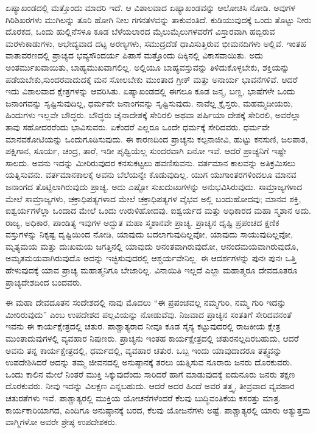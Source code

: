 ಏಷ್ಯಾಖಂಡದಲ್ಲಿ ಮತ್ತೊಂದು ಮಾದರಿ ಇದೆ. ಆ ವಿಶಾಲವಾದ ಏಷ್ಯಾಖಂಡವನ್ನು ಆಲೋಚಿಸಿ ನೋಡಿ. ಅವುಗಳ ಗಿರಿಶಿಖರಗಳು ಮುಗಿಲನ್ನು ತೂರಿ ಹೋಗಿ ನೀಲ ಗಗನ\break ತಳವನ್ನು ತಾಕುವಂತಿದೆ. ಕುಡಿಯುವುದಕ್ಕೆ ಒಂದು ತೊಟ್ಟು ನೀರು ದೊರಕದ, ಒಂದು ಹುಲ್ಲಿನೆಸಳೂ ಕೂಡ ಬೆಳೆಯಲಾರದ ಮೈಲುಮೈಲುಗಳವರೆಗೆ ವಿಸ್ತಾರವಾಗಿ ಹಬ್ಬಿರುವ ಮರಳುಕಾಡುಗಳು, ಅಭೇದ್ಯವಾದ ದಟ್ಟ ಅರಣ್ಯಗಳು, ಸಮುದ್ರದೆಡೆ ಧಾವಿಸುತ್ತಿರುವ ಭೀಮನದಿಗಳು ಅಲ್ಲಿವೆ. ಇಂತಹ ವಾತಾವರಣದಲ್ಲಿ ಪ್ರಾಚ್ಯದ ಭವ್ಯಸೌಂದರ್ಯ ಪಿಪಾಸೆ ಮತ್ತೊಂದು ದಿಕ್ಕಿನಲ್ಲಿ ವಿಕಾಸವಾಯಿತು. ಅದು ಅಂತರ್ಮುಖವಾಯಿತು, ಬಾಹ್ಯಮುಖವಾಗಲಿಲ್ಲ. ಅಲ್ಲಿಯೂ ಬಾಹ್ಯವಸ್ತುವನ್ನು ತಿಳಿದುಕೊಳ್ಳಬೇಕು, ಶಕ್ತಿಯನ್ನು ಪಡೆಯಬೇಕು,\break ಸುಂದರವಾದುದಕ್ಕೆ ಮನ ಸೋಲಬೇಕು ಮುಂತಾದ ಗ್ರೀಕ್​ ಮತ್ತು ಅನಾರ್ಯ ಭಾವನೆಗಳಿವೆ. ಆದರೆ ಇದು ವಿಶಾಲವಾದ ಕ್ಷೇತ್ರಗಳನ್ನು ಆವರಿಸಿತು. ಏಷ್ಯಾಖಂಡದಲ್ಲಿ ಈಗಲೂ ಕೂಡ ಜನ್ಮ, ಬಣ್ಣ, ಭಾಷೆಗಳೇ ಒಂದು ಜನಾಂಗವನ್ನು ಸೃಷ್ಟಿಸುವುದಿಲ್ಲ, ಧರ್ಮವೇ ಜನಾಂಗವನ್ನು ಸೃಷ್ಟಿಸುವುದು. ನಾವೆಲ್ಲ ಕ್ರೈಸ್ತರು, ಮಹಮ್ಮದೀಯರು, ಹಿಂದುಗಳು ಇಲ್ಲವೇ ಬೌದ್ಧರು. ಬೌದ್ಧರು ಚೈನಾದೇಶಕ್ಕೆ ಸೇರಿರಲಿ ಅಥವಾ ಪರ್ಷಿಯಾ ದೇಶಕ್ಕೆ ಸೇರಿರಲಿ, ಅವರೆಲ್ಲಾ ತಾವು ಸಹೋದರರೆಂದು ಭಾವಿಸುವರು. ಏಕೆಂದರೆ ಎಲ್ಲರೂ ಒಂದೇ ಧರ್ಮಕ್ಕೆ ಸೇರಿದವರು. ಧರ್ಮವೇ ಮಾನವಕೋಟಿಯನ್ನು ಒಂದುಗೂಡಿಸುವುದು. ಈ ಕಾರಣದಿಂದ ಪ್ರಾಚ್ಯನು ಕಲ್ಪನಾಜೀವಿ, ಹುಟ್ಟು ಕನಸುಣಿ, ಜಲಪಾತ, ಪಕ್ಷಿಗಾನ, ಸೂರ್ಯ, ಚಂದ್ರ, ತಾರೆ, ಇಡೀ ಪೃಥ್ವಿಯೆಲ್ಲ ಸುಂದರವಾಗಿ ಏನೋ ಇವೆ. ಆದರೆ ಪ್ರಾಚ್ಯನಿಗೆ ಇಷ್ಟೇ ಸಾಲದು. ಅವನು ಇದನ್ನು ಮೀರಿರುವುದರ ಕನಸುಕಟ್ಟಲು ಹವಣಿಸುವನು. ವರ್ತಮಾನ ಕಾಲವನ್ನು ಅತಿಕ್ರಮಿಸಲು ಯತ್ನಿಸುವನು. ವರ್ತಮಾನಕಾಲಕ್ಕೆ ಅವನು ಬೆಲೆಯನ್ನೇ ಕೊಡುವುದಿಲ್ಲ. ಯುಗ ಯುಗಾಂತರಗಳಿಂದಲೂ ಮಾನವ ಜನಾಂಗದ ತೊಟ್ಟಿಲಾಗಿರುವುದು ಪ್ರಾಚ್ಯ. ಅದು ಎಷ್ಟೋ ಸುಖದುಃಖಗಳನ್ನು ಅನುಭವಿಸಿರುವುದು. ಸಾಮ್ರಾಜ್ಯಗಳಾದ ಮೇಲೆ ಸಾಮ್ರಾಜ್ಯಗಳು, ಚಕ್ರಾಧಿಪತ್ಯಗಳಾದ ಮೇಲೆ ಚಕ್ರಾಧಿಪತ್ಯಗಳ ವೈಭವ ಅಲ್ಲಿ ಬಂದುಹೋದವು; ಮಾನವ ಶಕ್ತಿ, ಐಶ್ವರ್ಯಗಳೆಲ್ಲಾ ಒಂದಾದ ಮೇಲೆ ಒಂದು ಉರುಳಿಹೋದವು. ಐಶ್ವರ್ಯದ ಮತ್ತು ಅಧಿಕಾರದ ಮಹಾ ಸ್ಮಶಾನ ಅದು. ರಾಜ್ಯ, ಅಧಿಕಾರ, ಪಾಂಡಿತ್ಯ ಇವುಗಳ ಅದ್ಭುತ ಮಹಾ ಸ್ಮಶಾನವೇ ಪ್ರಾಚ್ಯ. ಪ್ರಾಚ್ಯನ ದೃಷ್ಟಿ ಪ್ರಪಂಚದ ಕ್ಷಣಿಕ ವಸ್ತುಗಳನ್ನು ನಿಕೃಷ್ಟ ದೃಷ್ಟಿಯಿಂದ ನೋಡಿ, ಯಾವುದು ಬದಲಾಗುವುದಿಲ್ಲವೋ, ಯಾವುದು ಸಾಯುವುದಿಲ್ಲವೋ, ಮೃತ್ಯಮಯ ಮತ್ತು ದುಃಖಮಯ ಜಗತ್ತಿನಲ್ಲಿ ಯಾವುದು ಅನಂತವಾಗಿರುವುದೋ, ಆನಂದಮಯವಾಗಿರುವುದೊ, ಅಮೃತಮಯ\-ವಾಗಿರುವುದೊ ಅದನ್ನು ಇಚ್ಛಿಸುವುದರಲ್ಲಿ ಆಶ್ಚರ್ಯವೇನಿಲ್ಲ. ಈ ಆದರ್ಶಗಳನ್ನು ಪುನಃ ಪುನಃ ಒತ್ತಿ ಹೇಳುವುದಕ್ಕೆ ಯಾವ ಪ್ರಾಚ್ಯ ಮಹಾತ್ಮನಿಗೂ ಬೇಜಾರಿಲ್ಲ. ವಿನಾಯಿತಿ ಇಲ್ಲದೆ ಎಲ್ಲಾ ಮಹಾತ್ಮರೂ ದೇವದೂತರೂ ಪ್ರಾಚ್ಯದೇಶದಿಂದ ಬಂದವರು.

ಈ ಮಹಾ ದೇವದೂತನ ಸಂದೇಶದಲ್ಲಿ ನಾವು ಮೊದಲು “ಈ ಪ್ರಪಂಚವಲ್ಲ ನಮ್ಮ\break ಗುರಿ, ನಮ್ಮ ಗುರಿ ಇದನ್ನು ಮೀರಿರುವುದು” ಎಂಬ ಉಪದೇಶದ ಪಲ್ಲವಿಯನ್ನು ನೋಡು\-ವೆವು. ನಿಜವಾದ ಪ್ರಾಚ್ಯನ ಸಂತತಿಗೆ ಸೇರಿದವನಂತೆ ಇವನು ಈ ಕಾರ್ಯಕ್ಷೇತ್ರದಲ್ಲಿ ಚತುರ. ಪಾಶ್ಚಾತ್ಯರಾದ ನೀವೂ ಕೂಡ ಸೈನ್ಯ ಕಟ್ಟುವುದರಲ್ಲಿ ರಾಜಕೀಯ ಕ್ಷೇತ್ರ ಮುಂತಾದುವು\-ಗಳಲ್ಲಿ ವ್ಯವಹಾರ ನಿಪುಣರು. ಪ್ರಾಚ್ಯನು ಇಂತಹ ಕಾರ್ಯಕ್ಷೇತ್ರದಲ್ಲಿ ಚತುರನಲ್ಲ\-ದಿರಬಹುದು, ಆದರೆ ಅವನು ತನ್ನ ಕಾರ್ಯಕ್ಷೇತ್ರದಲ್ಲಿ, ಧರ್ಮದಲ್ಲಿ, ವ್ಯವಹಾರ ಚತುರ. ಒಬ್ಬ ಇಂದು ಯಾವುದಾದರೂ ತತ್ತ್ವವನ್ನು ಉಪದೇಶಿಸಿದರೆ ಅದನ್ನು ತಮ್ಮ ಜೀವನದಲ್ಲಿ ಅನುಷ್ಠಾನಕ್ಕೆ ತರಲು ಯತ್ನಿಸುವ ನೂರಾರು ಜನರು ದೊರಕುವರು. ಒಂದು ಕಾಲಿನ ಮೇಲೆ ನಿಂತರೆ ಮುಕ್ತಿ ಸಿಕ್ಕುವುದೆಂದು ಸಾರಿದರೆ ಹಾಗೆ ಮಾಡುವುದಕ್ಕೆ ಐದುನೂರು ಜನರು ತಕ್ಷಣ ದೊರಕುವರು. ನೀವು ಇದನ್ನು ವಿಲಕ್ಷಣ ಎನ್ನಬಹುದು. ಆದರೆ ಅದರ ಹಿಂದೆ ಅವರ ತತ್ತ್ವ, ತೀವ್ರವಾದ ವ್ಯವಹಾರ ಚತುರತೆಗಳು ಇವೆ. ಪಾಶ್ಚಾತ್ಯರಲ್ಲಿ ಮುಕ್ತಿಯ ಯೋಚನೆಗಳೆಂದರೆ ಕೆಲವು ಬುದ್ಧಿವಂತಿಕೆಯ ಕಸರತ್ತು ಮಾತ್ರ. ಕಾರ್ಯಕಾರಿಯಾಗದ, ಎಂದಿಗೂ ಅನುಷ್ಠಾನಕ್ಕೆ ಬರದ, ಕೆಲವು ಯೋಜನೆಗಳು ಅಷ್ಟೆ. ಪಾಶ್ಚಾತ್ಯರಲ್ಲಿ ಯಾರು ಅತ್ಯುತ್ತಮ ವಾಗ್ಮಿಗಳೋ ಅವರೇ ಶ್ರೇಷ್ಠ ಉಪದೇಶಕರು.

